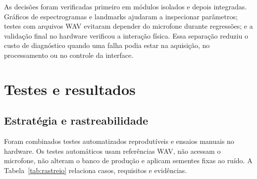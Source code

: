 \documentclass[12pt,a4paper]{article}
\begin{document}
As decisões foram verificadas primeiro em módulos isolados e depois integradas.
Gráficos de espectrogramas e landmarks ajudaram a inspecionar parâmetros; testes
com arquivos WAV evitaram depender do microfone durante regressões; e a validação
final no hardware verificou a interação física. Essa separação reduziu o custo de
diagnóstico quando uma falha podia estar na aquisição, no processamento ou no
controle da interface.

\section{Testes e resultados}
\label{sec:testes}

\subsection{Estratégia e rastreabilidade}

Foram combinados testes automatizados reprodutíveis e ensaios manuais no hardware.
Os testes automáticos usam referências WAV, não acessam o microfone, não alteram o
banco de produção e aplicam sementes fixas ao ruído. A Tabela~\ref{tab:rastreio}
relaciona casos, requisitos e evidências.
\end{document}
